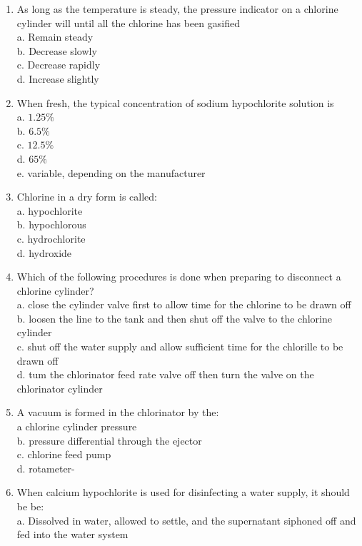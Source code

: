 \begin{enumerate}[1.]
\item As long as the temperature is steady, the pressure indicator on a chlorine cylinder will until all the chlorine has been gasified\\
a. Remain steady\\
b. Decrease slowly\\
c. Decrease rapidly\\
d. Increase slightly\\
\item When fresh, the typical concentration of sodium hypochlorite solution is\\
a. $1.25 \%$\\
b. $6.5 \%$\\
c. $12.5 \%$\\
d. $65 \%$\\
e. variable, depending on the manufacturer\\
\item Chlorine in a dry form is called:\\
a. hypochlorite\\
b. hypochlorous\\
c. hydrochlorite\\
d. hydroxide\\
\item Which of the following procedures is done when preparing to disconnect a chlorine cylinder?\\
a. close the cylinder valve first to allow time for the chlorine to be drawn off\\
b. loosen the line to the tank and then shut off the valve to the chlorine cylinder\\
c. shut off the water supply and allow sufficient time for the chlorille to be drawn off\\
d. tum the chlorinator feed rate valve off then turn the valve on the chlorinator cylinder\\
\item A vacuum is formed in the chlorinator by the:\\
a chlorine cylinder pressure\\
b. pressure differential through the ejector\\
c. chlorine feed pump\\
d. rotameter-\\
\item When calcium hypochlorite is used for disinfecting a water supply, it should be be:\\
a. Dissolved in water, allowed to settle, and the supernatant siphoned off and fed into the water system\\

\end{enumerate}
